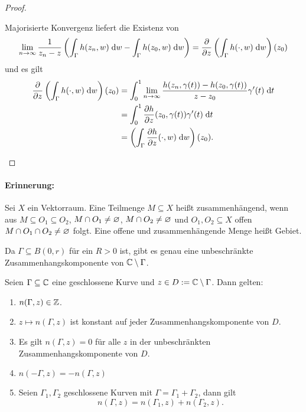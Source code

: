 \documentclass[a4paper,twoside,DIV15,BCOR12mm]{scrbook}
\begin{document}
\begin{proof}
\begin{enumerate}
Majorisierte Konvergenz liefert die Existenz von
\[\displaystyle\lim_{n\rightarrow\infty}\frac{1}{z_n-z}\left(\int_{\Gamma}^{}{h(z_n,w)}\;\mathrm{d} w-\int_{\Gamma}^{}{h(z_0,w)}\;\mathrm{d} w\right) = \frac{\partial}{\partial z}\left(\int_{\Gamma}^{}{h(\cdot,w)}\;\mathrm{d} w\right)(z_0)\]
und es gilt
\begin{align*}
\frac{\partial}{\partial z}\left(\integral{\Gamma}{}{h(\cdot,w)}{w}\right)(z_0) &=\integral{0}{1}{\limf{n}\frac{h(z_n,\gamma(t))-h(z_0,\gamma(t))}{z-z_0}\gamma^\prime(t)}{t}\\
&=\integral{0}{1}{\frac{\partial h}{\partial z}(z_0,\gamma(t))\gamma^\prime(t)}{t}\\
&=\left(\integral{\Gamma}{}{\frac{\partial h}{\partial z}(\cdot,w)}{w}\right)(z_0).\tag*{\qedhere}%
\end{align*}
\end{enumerate}\end{proof}

\paragraph{Erinnerung:} Sei $X$ ein Vektorraum. Eine Teilmenge $M\subseteq X$ heißt zusammenhängend, wenn aus $M\subseteq O_1\subseteq O_2$, $M\cap O_1\neq \varnothing$, $M\cap O_2\neq\varnothing$ und $O_1,O_2\subseteq X$ offen $M\cap O_1 \cap O_2 \neq \varnothing$ folgt. Eine offene und zusammenhängende Menge heißt Gebiet.


\begin{bem*} Da $\Gamma \subseteq B(0,r)$ für ein $R>0$ ist, gibt es genau eine unbeschränkte Zusammenhangskomponente von $\mathbb{C}\setminus\Gamma$.
\end{bem*}

\begin{satz}\label{satz2.16}
Seien $\Gamma \subseteq \mathbb{C}$ eine geschlossene Kurve und $z\in D:= \mathbb{C}\setminus\Gamma$. Dann gelten:
\begin{enumerate}
\item $n(\Gamma,z)\in\mathbb{Z}$.
\item $z\mapsto n(\Gamma,z)$ ist konstant auf jeder Zusammenhangskomponente von $D$.
\item Es gilt $n(\Gamma,z) = 0$ für alle $z$ in der unbeschränkten Zusammenhangskomponente von $D$.
\item $n(-\Gamma,z) = -n(\Gamma,z)$
\item Seien $\Gamma_1,\Gamma_2$ geschlossene Kurven mit $\Gamma = \Gamma_1 + \Gamma_2$, dann gilt
\[n(\Gamma,z) = n(\Gamma_1,z)+n(\Gamma_2,z).\]
\end{enumerate}
\end{satz}
\end{document}
